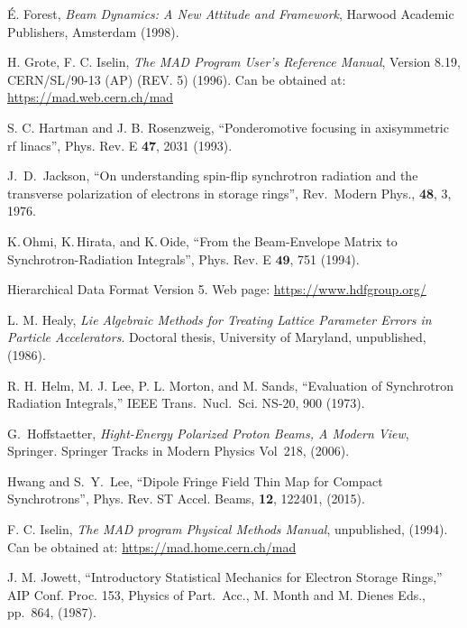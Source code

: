 \begin{thebibliography}{XXXXXXX99}
\'E. Forest, {\em Beam Dynamics: A New Attitude and Framework},
Harwood Academic Publishers, Amsterdam (1998).

H. Grote, F. C. Iselin, {\it The MAD Program User's Reference Manual},
Version 8.19, CERN/SL/90-13 (AP) (REV. 5) (1996). 
Can be obtained at:
\hfill\break
\hspace*{0.3in}
\url{https://mad.web.cern.ch/mad} 

S. C. Hartman and J. B. Rosenzweig, 
``Ponderomotive focusing in axisymmetric rf linacs'',
Phys. Rev. E {\bf 47}, 2031 (1993).

J.~D.~Jackson,
``On understanding spin-flip synchrotron radiation and the transverse 
polarization of electrons in storage rings'',
Rev.\ Modern Phys., {\bf 48}, 3, 1976.

K.\,Ohmi, K.\,Hirata, and K.\,Oide,
``From the Beam-Envelope Matrix to Synchrotron-Radiation Integrals'',
Phys. Rev. E $\mathbf{49}$, 751 (1994).

Hierarchical Data Format Version 5. Web page:
\hfill\break
\hspace*{0.3in} \url{https://www.hdfgroup.org/}

L. M. Healy, {\it Lie Algebraic Methods for Treating Lattice Parameter
Errors in Particle Accelerators}. Doctoral thesis, University of
Maryland, unpublished, (1986).

R. H. Helm, M. J. Lee, P. L. Morton, and M. Sands, 
``Evaluation of Synchrotron Radiation Integrals,''
IEEE Trans.~Nucl.~Sci. NS-20, 900 (1973).

G.~Hoffstaetter, 
{\it Hight-Energy Polarized Proton Beams, A Modern View}, 
Springer. Springer Tracks in Modern Physics Vol~218, (2006).

Hwang and S.~Y.~Lee, 
``Dipole Fringe Field Thin Map for Compact Synchrotrons'',
Phys. Rev. ST Accel. Beams, {\bf 12}, 122401, (2015).

F. C. Iselin, 
{\it The MAD program Physical Methods Manual}, 
unpublished, (1994). Can be obtained at: 
\hfill\break
\hspace*{0.3in}
\url{https://mad.home.cern.ch/mad}

J. M. Jowett, 
``Introductory Statistical Mechanics for Electron Storage Rings,'' 
AIP Conf. Proc. 153, Physics of Part.\ Acc.,
M. Month and M. Dienes Eds., pp.~864, (1987).


\end{thebibliography}
